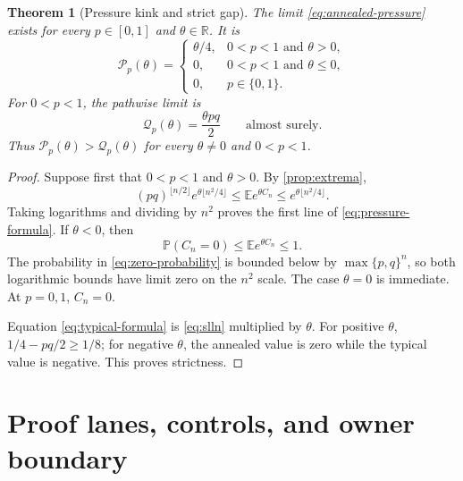 \documentclass[11pt,a4paper]{amsart}
\newtheorem{theorem}{Theorem}[section]
\theoremstyle{definition}
\theoremstyle{remark}
\newcommand{\Prob}{\mathbb P}
\newcommand{\Exp}{\mathbb E}
\newcommand{\R}{\mathbb R}
\begin{document}
\begin{theorem}[Pressure kink and strict gap]
\label{thm:pressure}
The limit \eqref{eq:annealed-pressure} exists for every $p\in[0,1]$ and
$\theta\in\R$.  It is
\begin{equation}\label{eq:pressure-formula}
 \boxed{\quad
 \mathcal P_p(\theta)=
 \begin{cases}
 \theta/4,&0<p<1\text{ and }\theta>0,\\
 0,&0<p<1\text{ and }\theta\leq0,\\
 0,&p\in\{0,1\}.
 \end{cases}\quad}
\end{equation}
For $0<p<1$, the pathwise limit is
\begin{equation}\label{eq:typical-formula}
 \mathcal Q_p(\theta)=\frac{\theta pq}{2}
 \qquad\text{almost surely}.
\end{equation}
Thus $\mathcal P_p(\theta)>\mathcal Q_p(\theta)$ for every
$\theta\neq0$ and $0<p<1$.
\end{theorem}

\begin{proof}
Suppose first that $0<p<1$ and $\theta>0$.  By
\cref{prop:extrema},
\[
 (pq)^{\lfloor n/2\rfloor}
 e^{\theta\lfloor n^2/4\rfloor}
 \leq \Exp e^{\theta C_n}
 \leq e^{\theta\lfloor n^2/4\rfloor}.
\]
Taking logarithms and dividing by $n^2$ proves the first line of
\eqref{eq:pressure-formula}.  If $\theta<0$, then
\[
 \Prob(C_n=0)\leq\Exp e^{\theta C_n}\leq1.
\]
The probability in \eqref{eq:zero-probability} is bounded below by
$\max\{p,q\}^n$, so both logarithmic bounds have limit zero on the
$n^2$ scale.  The case $\theta=0$ is immediate.  At $p=0,1$, $C_n=0$.

Equation \eqref{eq:typical-formula} is \eqref{eq:slln} multiplied by
$\theta$.  For positive $\theta$,
$1/4-pq/2\geq1/8$; for negative $\theta$, the annealed value is zero while
the typical value is negative.  This proves strictness.
\end{proof}

\section{Proof lanes, controls, and owner boundary}
\label{sec:scope}
\end{document}
